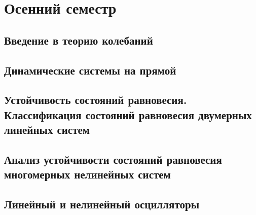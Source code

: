\documentclass[14pt,a4paper]{extreport}
\theoremstyle{definition}
\begin{document}


\newpage
\tableofcontents 
\newpage
\part{Осенний семестр}
\chapter{Введение в теорию колебаний}
\label{lect1}
	


\newpage
\chapter{Динамические системы на прямой}
\label{lect2}
	

\newpage
\chapter{Устойчивость состояний равновесия. Классификация состояний равновесия двумерных линейных
систем}
\label{lect3}
	

\newpage
\chapter{Анализ устойчивости состояний равновесия многомерных нелинейных систем}
\label{lect4}
	
        
\newpage
\chapter{Линейный и нелинейный осцилляторы}
\label{sec:lect5}
    



\end{document}
